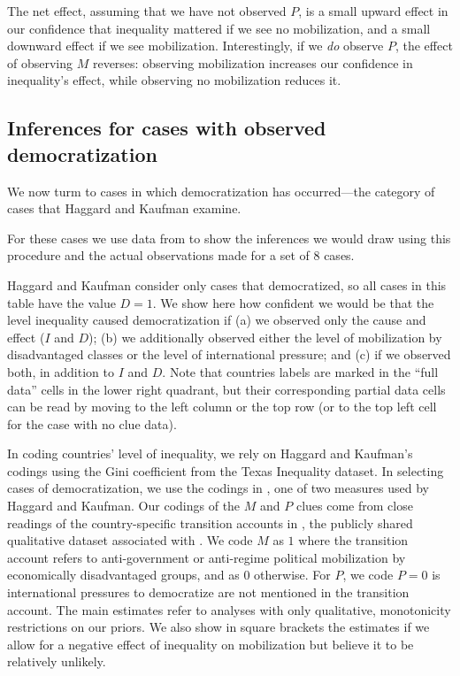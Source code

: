 \documentclass[12pt,]{book}
\begin{document}
The net effect, assuming that we have not observed \(P\), is a small upward effect in our confidence that inequality mattered if we see no mobilization, and a small downward effect if we see mobilization. Interestingly, if we \emph{do} observe \(P\), the effect of observing \(M\) reverses: observing mobilization increases our confidence in inequality's effect, while observing no mobilization reduces it.

\hypertarget{inferences-for-cases-with-observed-democratization}{%
\subsection{Inferences for cases with observed democratization}\label{inferences-for-cases-with-observed-democratization}}

We now turm to cases in which democratization has occurred---the category of cases that Haggard and Kaufman examine.

For these cases we use data from \citet{haggard2012inequality} to show the inferences we would draw using this procedure and the actual observations made for a set of 8 cases.

Haggard and Kaufman consider only cases that democratized, so all cases in this table have the value \(D=1\). We show here how confident we would be that the level inequality caused democratization if (a) we observed only the cause and effect (\(I\) and \(D\)); (b) we additionally observed either the level of mobilization by disadvantaged classes or the level of international pressure; and (c) if we observed both, in addition to \(I\) and \(D\). Note that countries labels are marked in the ``full data'' cells in the lower right quadrant, but their corresponding partial data cells can be read by moving to the left column or the top row (or to the top left cell for the case with no clue data).

In coding countries' level of inequality, we rely on Haggard and Kaufman's codings using the Gini coefficient from the Texas Inequality dataset. In selecting cases of democratization, we use the codings in \citet{cheibub2010democracy}, one of two measures used by Haggard and Kaufman. Our codings of the \(M\) and \(P\) clues come from close readings of the country-specific transition accounts in \citet{haggard2012distributive}, the publicly shared qualitative dataset associated with \citet{haggard2012inequality}. We code \(M\) as \(1\) where the transition account refers to anti-government or anti-regime political mobilization by economically disadvantaged groups, and as \(0\) otherwise. For \(P\), we code \(P=0\) is international pressures to democratize are not mentioned in the transition account. The main estimates refer to analyses with only qualitative, monotonicity restrictions on our priors. We also show in square brackets the estimates if we allow for a negative effect of inequality on mobilization but believe it to be relatively unlikely.
\end{document}
